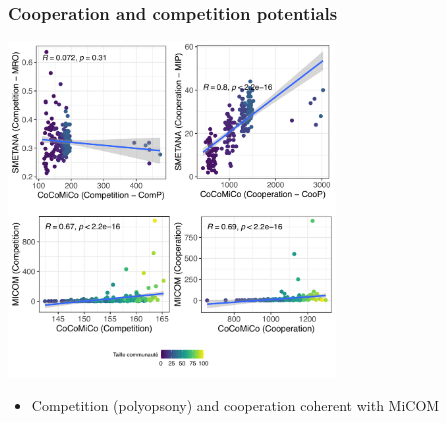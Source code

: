 \documentclass[8pt,usenames,dvipsnames]{beamer}
\begin{document}
\begin{frame}
\frametitle{Cooperation and competition potentials}
\centering
\includegraphics[width=0.65\textwidth]{figures/ccmc-micom-smetana.pdf}
\begin{block}{}
\begin{itemize}
\item Competition (polyopsony) and cooperation coherent with MiCOM
\end{itemize}
\end{block}
\end{frame}
\end{document}
